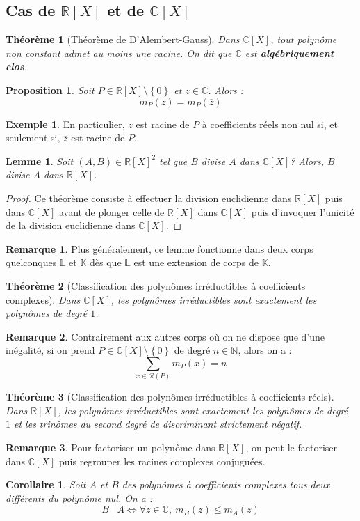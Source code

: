 \documentclass[french]{book}
\newcommand{\N}{\mathbb{N}}
\newcommand{\R}{\mathbb{R}}
\newcommand{\C}{\mathbb{C}}
\newcommand{\K}{\mathbb{K}}
\theoremstyle{plain}
\newtheorem{thm}{Théorème}[chapter]
\newtheorem{lem}{Lemme}[chapter]
\newtheorem{prop}{Proposition}[chapter]
\newtheorem{cor}{Corollaire}[chapter]
\theoremstyle{definition}
\newtheorem{exa}{Exemple}[chapter]
\newtheorem{rmq}{Remarque}[chapter]
\theoremstyle{remark}
\begin{document}
\subsection{Cas de $\R[X]$ et de $\C[X]$}
\begin{thm}[Théorème de D'Alembert-Gauss]
	Dans $\C[X]$, tout polynôme non constant admet au moins une racine. On dit que $\C$ est \textbf{algébriquement clos}.
\end{thm}
\begin{prop}
	Soit $P\in\R[X]\setminus\left\{0\right\}$ et $z\in\C$. Alors : $$m_P(z)=m_P(\overline{z})$$
\end{prop}
\begin{exa}
	En particulier, $z$ est racine de $P$ à coefficients réels non nul si, et seulement si, $\overline{z}$ est racine de $P$.
\end{exa}
\begin{lem}
	Soit $(A,B)\in\R[X]^2$ tel que $B$ divise $A$ dans $\C[X]$? Alors, $B$ divise $A$ dans $\R[X]$.
\end{lem}
\begin{proof}
	Ce théorème consiste à effectuer la division euclidienne dans $\R[X]$ puis dans $\C[X]$ avant de plonger celle de $\R[X]$ dans $\C[X]$ puis d'invoquer l'unicité de la division euclidienne dans $\C[X]$.
\end{proof}
\begin{rmq}
	Plus généralement, ce lemme fonctionne dans deux corps quelconques $\mathbb{L}$ et $\K$ dès que $\mathbb{L}$ est une extension de corps de $\K$.
\end{rmq}
\begin{thm}[Classification des polynômes irréductibles à coefficients complexes]
	Dans $\C[X]$, les polynômes irréductibles sont exactement les polynômes de degré $1$.
\end{thm}
\begin{rmq}
	Contrairement aux autres corps où on ne dispose que d'une inégalité, si on prend $P\in\C[X]\setminus\left\{0\right\}$ de degré $n\in\N$, alors on a : $$\sum_{x\in\mathcal{R}(P)}m_P(x)=n$$
\end{rmq}
\begin{thm}[Classification des polynômes irréductibles à coefficients réels]
	Dans $\R[X]$, les polynômes irréductibles sont exactement les polynômes de degré $1$ et les trinômes du second degré de discriminant strictement négatif.
\end{thm}
\begin{rmq}
	Pour factoriser un polynôme dans $\R[X]$, on peut le factoriser dans $\C[X]$ puis regrouper les racines complexes conjuguées.
\end{rmq}
\begin{cor}
	Soit $A$ et $B$ des polynômes à coefficients complexes tous deux différents du polynôme nul. On a : $$B\mid A \Longleftrightarrow\forall z\in \C,\ m_B(z)\leqslant m_A(z)$$
\end{cor}
\end{document}
